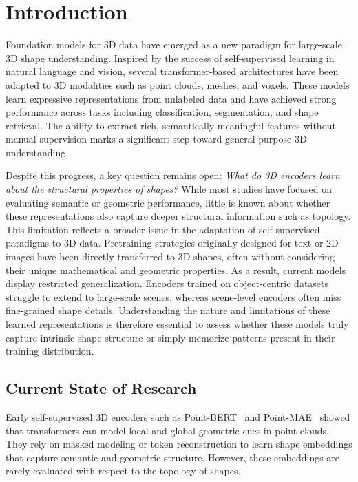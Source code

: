 \section{Introduction}
\label{sec:intro}


Foundation models for 3D data have emerged as a new paradigm for large-scale 3D shape understanding. Inspired by the success of self-supervised learning in natural language and vision, several transformer-based architectures have been adapted to 3D modalities such as point clouds, meshes, and voxels. These models learn expressive representations from unlabeled data and have achieved strong performance across tasks including classification, segmentation, and shape retrieval. The ability to extract rich, semantically meaningful features without manual supervision marks a significant step toward general-purpose 3D understanding.

Despite this progress, a key question remains open: \textit{What do 3D encoders learn about the structural properties of shapes?} While most studies have focused on evaluating semantic or geometric performance, little is known about whether these representations also capture deeper structural information such as topology. This limitation reflects a broader issue in the adaptation of self-supervised paradigms to 3D data. Pretraining strategies originally designed for text or 2D images have been directly transferred to 3D shapes, often without considering their unique mathematical and geometric properties. As a result, current models display restricted generalization. Encoders trained on object-centric datasets struggle to extend to large-scale scenes, whereas scene-level encoders often miss fine-grained shape details. Understanding the nature and limitations of these learned representations is therefore essential to assess whether these models truly capture intrinsic shape structure or simply memorize patterns present in their training distribution.

\subsection{Current State of Research}

Early self-supervised 3D encoders such as Point-BERT~\cite{pbert} and Point-MAE~\cite{pmae} showed that transformers can model local and global geometric cues in point clouds. They rely on masked modeling or token reconstruction to learn shape embeddings that capture semantic and geometric structure. However, these embeddings are rarely evaluated with respect to the topology of shapes.


